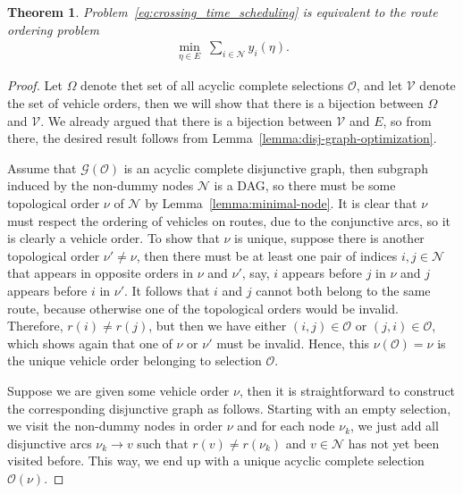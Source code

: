 \documentclass[a4paper]{report}
\theoremstyle{definition}
\theoremstyle{plain}
\newtheorem{theorem}{Theorem}[chapter]
\begin{document}
\begin{theorem}
  Problem~\eqref{eq:crossing_time_scheduling} is equivalent to the \emph{route ordering problem}
  \begin{align}\tag{RO}
    \label{eq:RO}
    \min_{\eta \in E} \; \sum_{i \in \mathcal{N}} y_i(\eta) .
  \end{align}
\end{theorem}
\begin{proof}
  Let $\Omega$ denote thet set of all acyclic complete selections $\mathcal{O}$,
  and let $\mathcal{V}$ denote the set of vehicle orders, then we will show that there is
  a bijection between $\Omega$ and $\mathcal{V}$.
  We already argued that there is a bijection between $\mathcal{V}$ and $E$, so from
  there, the desired result follows from
  Lemma~\ref{lemma:disj-graph-optimization}.

  Assume that $\mathcal{G}(\mathcal{O})$ is an acyclic complete disjunctive graph, then
  subgraph induced by the non-dummy nodes $\mathcal{N}$ is a DAG, so there must
  be some topological order $\nu$ of $\mathcal{N}$ by
  Lemma~\ref{lemma:minimal-node}.
  It is clear that $\nu$ must respect the ordering of vehicles on routes, due to
  the conjunctive arcs, so it is clearly a vehicle order.
  To show that $\nu$ is unique, suppose there is another topological order
  $\nu' \neq \nu$, then there must be at least one pair of indices
  $i,j \in \mathcal{N}$ that appears in opposite orders in $\nu$ and $\nu'$,
  say, $i$ appears before $j$ in $\nu$ and $j$ appears before $i$ in $\nu'$. It
  follows that $i$ and $j$ cannot both belong to the same route, because
  otherwise one of the topological orders would be invalid.
  Therefore, $r(i) \neq r(j)$, but then we have either $(i,j) \in \mathcal{O}$
  or $(j,i) \in \mathcal{O}$, which shows again that one of $\nu$ or $\nu'$ must
  be invalid.
  Hence, this $\nu(\mathcal{O}) = \nu$ is the unique vehicle order belonging to
  selection $\mathcal{O}$.

  Suppose we are given some vehicle order $\nu$, then it is straightforward to
  construct the corresponding disjunctive graph as follows.
  Starting with an empty selection, we visit the non-dummy nodes in order $\nu$
  and for each node $\nu_k$, we just add all disjunctive arcs
  $\nu_k \rightarrow v$ such that $r(v) \neq r(\nu_k)$ and $v \in \mathcal{N}$
  has not yet been visited before.
  This way, we end up with a unique acyclic complete selection
  $\mathcal{O}(\nu)$.
\end{proof}
\end{document}
